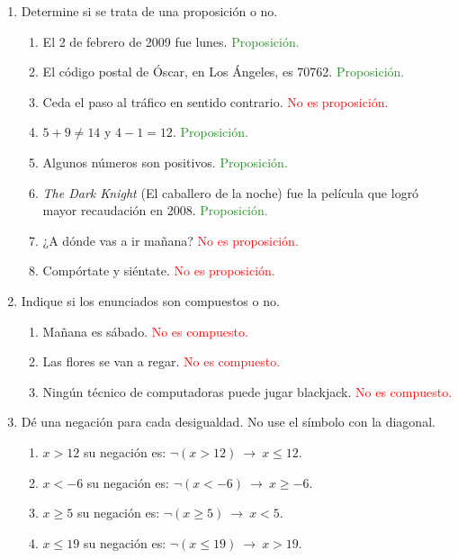 \documentclass[12pt,letterpaper]{exam}
\begin{document}
\begin{enumerate}
  \item Determine si se trata de una proposición o no.
  \begin{enumerate}[label=\alph*)]
    \item El 2 de febrero de 2009 fue lunes. \textcolor{ForestGreen}{Proposición.}
    \item El código postal de Óscar, en Los Ángeles, es 70762. \textcolor{ForestGreen}{Proposición.}
    \item Ceda el paso al tráfico en sentido contrario. \textcolor{red}{No es proposición.}
    \item $5+9 \neq 14$ y $4-1=12$. \textcolor{ForestGreen}{Proposición.}
    \item Algunos números son positivos. \textcolor{ForestGreen}{Proposición.}
    \item \textit{The Dark Knight} (El caballero de la noche) fue la película que logró mayor recaudación en 2008. \textcolor{ForestGreen}{Proposición.}
    \item ¿A dónde vas a ir mañana? \textcolor{red}{No es proposición.}
    \item Compórtate y siéntate. \textcolor{red}{No es proposición.}
  \end{enumerate}

  \item Indique si los enunciados son compuestos o no.
  \begin{enumerate}[label=\alph*)]
    \item Mañana es sábado. \textcolor{red}{No es compuesto.}
    \item Las flores se van a regar. \textcolor{red}{No es compuesto.}
    \item Ningún técnico de computadoras puede jugar blackjack. \textcolor{red}{No es compuesto.}
  \end{enumerate}

  \item Dé una negación para cada desigualdad. No use el símbolo con la diagonal.
  \begin{enumerate}[label=\alph*)]
    \item $x>12$ \; su negación es: \; $\neg(x>12)\ \rightarrow\ x\leq 12$.
    \item $x<-6$ \; su negación es: \; $\neg(x<-6)\ \rightarrow\ x\geq -6$.
    \item $x\geq 5$ \; su negación es: \; $\neg(x\geq 5)\ \rightarrow\ x<5$.
    \item $x\leq 19$ \; su negación es: \; $\neg(x\leq 19)\ \rightarrow\ x>19$.
  \end{enumerate}


\end{enumerate}
\end{document}
